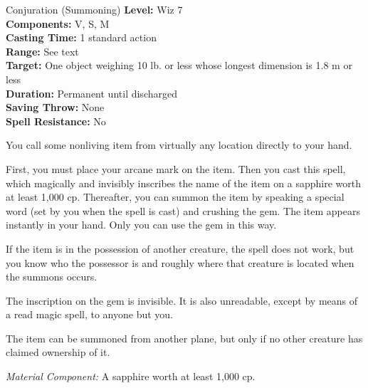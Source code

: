 
{Conjuration (Summoning)}
{
	\textbf{Level:}
	Wiz 7\\
	\textbf{Components:}
	V, S, M\\
	\textbf{Casting Time:}
	1 standard action\\
	\textbf{Range:}
	See text\\
	\textbf{Target:}
	One object weighing 10 lb. or less whose longest dimension is 1.8 m or less\\
	\textbf{Duration:}
	Permanent until discharged\\
	\textbf{Saving Throw:}
	None\\
	\textbf{Spell Resistance:}
	No\\
}
{
	You call some nonliving item from virtually any location directly to your hand.

	First, you must place your arcane mark on the item. Then you cast this spell, which magically and invisibly inscribes the name of the item on a sapphire worth at least 1,000 cp. Thereafter, you can summon the item by speaking a special word (set by you when the spell is cast) and crushing the gem. The item appears instantly in your hand. Only you can use the gem in this way.

	If the item is in the possession of another creature, the spell does not work, but you know who the possessor is and roughly where that creature is located when the summons occurs.

	The inscription on the gem is invisible. It is also unreadable, except by means of a read magic spell, to anyone but you.

	The item can be summoned from another plane, but only if no other creature has claimed ownership of it.

	\textit{Material Component:}
	A sapphire worth at least 1,000 cp.

}
